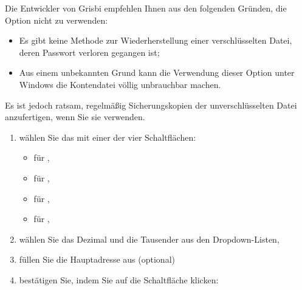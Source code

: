 \begin{enumerate}
Die Entwickler von Grisbi empfehlen Ihnen aus den folgenden Gründen, die Option  nicht zu verwenden:%
\begin{itemize}
	\item Es gibt keine Methode zur Wiederherstellung einer verschlüsselten Datei, deren Passwort verloren gegangen ist;%
	\item Aus einem unbekannten Grund kann die Verwendung dieser Option unter \gls{Windows} die Kontendatei völlig unbrauchbar machen.%
\end{itemize}  
Es ist jedoch ratsam, regelmäßig Sicherungskopien der unverschlüsselten Datei anzufertigen, wenn Sie sie verwenden.%

		\begin{enumerate}[resume]		%
			\item wählen Sie das  mit einer der vier Schaltflächen:%
				\begin{itemize}	
				\item[\textopenbullet]  für ,
				\item[\textopenbullet]  für ,
				\item[\textopenbullet]  für ,
				\item[\textopenbullet]  für ,
				\end{itemize}
			\item wählen Sie das Dezimal  und die Tausender aus den Dropdown-Listen,%
			\item füllen Sie die Hauptadresse aus (optional)%
			\item bestätigen Sie, indem Sie auf die Schaltfläche  klicken:%
		\end{enumerate}


\end{enumerate}
